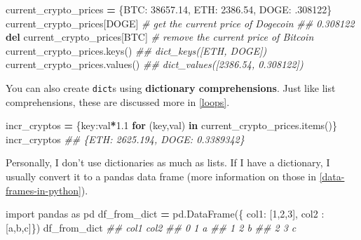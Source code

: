 \documentclass[
  12pt,
]{krantz}
\makeatletter
\newenvironment{Shaded}{\begin{snugshade}}{\end{snugshade}}
\newcommand{\CommentTok}[1]{\textcolor[rgb]{0.37,0.37,0.37}{\textit{#1}}}
\newcommand{\ControlFlowTok}[1]{\textcolor[rgb]{0.27,0.27,0.27}{\textbf{#1}}}
\newcommand{\DecValTok}[1]{\textcolor[rgb]{0.06,0.06,0.06}{#1}}
\newcommand{\FloatTok}[1]{\textcolor[rgb]{0.06,0.06,0.06}{#1}}
\newcommand{\ImportTok}[1]{#1}
\newcommand{\KeywordTok}[1]{\textcolor[rgb]{0.27,0.27,0.27}{\textbf{#1}}}
\newcommand{\NormalTok}[1]{#1}
\newcommand{\OperatorTok}[1]{\textcolor[rgb]{0.43,0.43,0.43}{\textbf{#1}}}
\newcommand{\StringTok}[1]{\textcolor[rgb]{0.5,0.5,0.5}{#1}}
\newenvironment{kframe}{%
\medskip{}
\setlength{\fboxsep}{.8em}
 \def\at@end@of@kframe{}%
 \ifinner\ifhmode%
  \def\at@end@of@kframe{\end{minipage}}%
  \begin{minipage}{\columnwidth}%
 \fi\fi%
 \def\FrameCommand##1{\hskip\@totalleftmargin \hskip-\fboxsep
 \colorbox{shadecolor}{##1}\hskip-\fboxsep
     \hskip-\linewidth \hskip-\@totalleftmargin \hskip\columnwidth}%
 \MakeFramed {\advance\hsize-\width
   \@totalleftmargin\z@ \linewidth\hsize
   \@setminipage}}%
 {\par\unskip\endMakeFramed%
 \at@end@of@kframe}
\renewenvironment{Shaded}{\begin{kframe}}{\end{kframe}}
\makeatother
\begin{document}
\begin{Shaded}
\begin{Highlighting}[]
\NormalTok{current\_crypto\_prices }\OperatorTok{=}\NormalTok{ \{}\StringTok{\textquotesingle{}BTC\textquotesingle{}}\NormalTok{: }\FloatTok{38657.14}\NormalTok{, }\StringTok{\textquotesingle{}ETH\textquotesingle{}}\NormalTok{: }\FloatTok{2386.54}\NormalTok{, }\StringTok{\textquotesingle{}DOGE\textquotesingle{}}\NormalTok{: }\FloatTok{.308122}\NormalTok{\}}
\NormalTok{current\_crypto\_prices[}\StringTok{\textquotesingle{}DOGE\textquotesingle{}}\NormalTok{] }\CommentTok{\# get the current price of Dogecoin}
\CommentTok{\#\# 0.308122}
\KeywordTok{del}\NormalTok{ current\_crypto\_prices[}\StringTok{\textquotesingle{}BTC\textquotesingle{}}\NormalTok{] }\CommentTok{\# remove the current price of Bitcoin}
\NormalTok{current\_crypto\_prices.keys()}
\CommentTok{\#\# dict\_keys([\textquotesingle{}ETH\textquotesingle{}, \textquotesingle{}DOGE\textquotesingle{}])}
\NormalTok{current\_crypto\_prices.values()}
\CommentTok{\#\# dict\_values([2386.54, 0.308122])}
\end{Highlighting}
\end{Shaded}

You can also create \texttt{dict}s using \textbf{dictionary comprehensions}. Just like list comprehensions, these are discussed more in \ref{loops}.

\begin{Shaded}
\begin{Highlighting}[]
\NormalTok{incr\_cryptos }\OperatorTok{=}\NormalTok{ \{key:val}\OperatorTok{*}\FloatTok{1.1} \ControlFlowTok{for}\NormalTok{ (key,val) }\KeywordTok{in}\NormalTok{ current\_crypto\_prices.items()\}}
\NormalTok{incr\_cryptos}
\CommentTok{\#\# \{\textquotesingle{}ETH\textquotesingle{}: 2625.194, \textquotesingle{}DOGE\textquotesingle{}: 0.3389342\}}
\end{Highlighting}
\end{Shaded}

Personally, I don't use dictionaries as much as lists. If I have a dictionary, I usually convert it to a pandas data frame (more information on those in \ref{data-frames-in-python}).

\begin{Shaded}
\begin{Highlighting}[]
\ImportTok{import}\NormalTok{ pandas }\ImportTok{as}\NormalTok{ pd}
\NormalTok{df\_from\_dict }\OperatorTok{=}\NormalTok{ pd.DataFrame(\{ }\StringTok{\textquotesingle{}col1\textquotesingle{}}\NormalTok{: [}\DecValTok{1}\NormalTok{,}\DecValTok{2}\NormalTok{,}\DecValTok{3}\NormalTok{], }\StringTok{\textquotesingle{}col2\textquotesingle{}}\NormalTok{ : [}\StringTok{\textquotesingle{}a\textquotesingle{}}\NormalTok{,}\StringTok{\textquotesingle{}b\textquotesingle{}}\NormalTok{,}\StringTok{\textquotesingle{}c\textquotesingle{}}\NormalTok{]\})}
\NormalTok{df\_from\_dict}
\CommentTok{\#\#    col1 col2}
\CommentTok{\#\# 0     1    a}
\CommentTok{\#\# 1     2    b}
\CommentTok{\#\# 2     3    c}
\end{Highlighting}
\end{Shaded}
\end{document}
